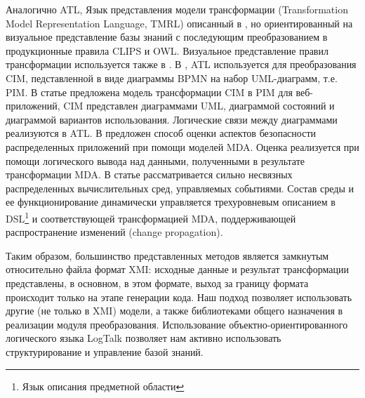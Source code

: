 \documentclass[conference]{IEEEtran} \IEEEoverridecommandlockouts
\begin{document}
Аналогично ATL, Язык представления модели трансформации (Transformation Model Representation Language, TMRL) описанный в \cite{nikita}, но ориентированный на визуальное представление базы знаний с последующим преобразованием в продукционные правила CLIPS и OWL. Визуальное представление правил трансформации используется также в \cite{GT}. В \cite{azis}, ATL используется для преобразования CIM, педставленной в виде диаграммы BPMN на набор UML-диаграмм, т.е. PIM. В статье \cite{Rhazali} предложена модель трансформации CIM в PIM для веб-приложений, CIM представлен диаграммами UML, диаграммой состояний и диаграммой вариантов использования.  Логические связи между диаграммами реализуются в ATL. В \cite{Hamid} предложен способ оценки аспектов безопасности распределенных приложений при помощи моделей MDA.  Оценка реализуется при помощи логического вывода над данными, полученными в результате трансформации MDA. В статье \cite{Zdun} рассматривается сильно несвязных распределенных вычислительных сред, управляемых событиями.  Состав среды и ее функционирование динамически управляется трехуровневым описанием в DSL\footnote{Язык описания предметной области } и соответствующей трансформацией MDA, поддерживающей распространение изменений (change propagation). 

Таким образом, большинство представленных методов является замкнутым относительно файла формат XMI: исходные данные и результат трансформации представлены, в основном, в этом формате, выход за границу формата происходит только на этапе генерации кода. Наш подход позволяет использовать другие (не только в XMI) модели, а также библиотеками общего назначения в реализации модуля преобразования. Использование объектно-ориентированного логического языка LogTalk позволяет нам активно использовать структурирование и управление базой знаний. 
\end{document}
